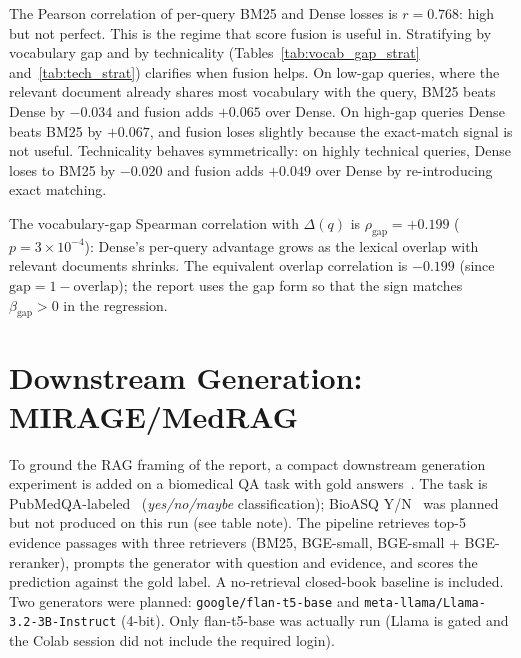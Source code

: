 \documentclass[11pt,a4paper]{article}
\begin{document}
The Pearson correlation of per-query BM25 and Dense losses is
$r = 0.768$: high but not perfect. This is the regime that score
fusion is useful in. Stratifying by vocabulary gap and by technicality
(Tables~\ref{tab:vocab_gap_strat} and~\ref{tab:tech_strat}) clarifies
when fusion helps. On low-gap queries, where the relevant document
already shares most vocabulary with the query, BM25 beats Dense by
$-0.034$ and fusion adds $+0.065$ over Dense. On high-gap queries
Dense beats BM25 by $+0.067$, and fusion loses slightly because the
exact-match signal is not useful. Technicality behaves symmetrically:
on highly technical queries, Dense loses to BM25 by $-0.020$ and
fusion adds $+0.049$ over Dense by re-introducing exact matching.

\begin{table}[ht]
\centering
\caption{Vocabulary-gap stratification of NFCorpus test (tertile split).
The vocabulary gap is $1 - \max_{d \in \text{qrel}(q)}
\text{overlap}(q, d)$.}
\label{tab:vocab_gap_strat}
\small

\end{table}

\begin{table}[ht]
\centering
\caption{Technicality (mean IDF) stratification of NFCorpus test
(tertile split).}
\label{tab:tech_strat}
\small

\end{table}

The vocabulary-gap Spearman correlation with $\Delta(q)$ is
$\rho_{\text{gap}} = +0.199$ ($p = 3\!\times\!10^{-4}$): Dense's
per-query advantage grows as the lexical overlap with relevant
documents shrinks. The equivalent overlap correlation is $-0.199$
(since $\text{gap} = 1 - \text{overlap}$); the report uses the gap
form so that the sign matches $\beta_{\text{gap}} > 0$ in the
regression.

\section{Downstream Generation: MIRAGE/MedRAG}
\label{sec:downstream}

To ground the RAG framing of the report, a compact downstream
generation experiment is added on a biomedical QA task with gold
answers~\cite{Xiong2024MIRAGE}. The task is
PubMedQA-labeled~\cite{Jin2019PubMedQA} (\textit{yes/no/maybe}
classification); BioASQ Y/N~\cite{Tsatsaronis2015BioASQ} was planned but
not produced on this run (see table note). The pipeline retrieves
top-5 evidence passages with three retrievers (BM25, BGE-small,
BGE-small + BGE-reranker), prompts the generator with question and
evidence, and scores the prediction against the gold label. A
no-retrieval closed-book baseline is included. Two generators were
planned: \texttt{google/flan-t5-base} and
\texttt{meta-llama/Llama-3.2-3B-Instruct} (4-bit). Only flan-t5-base
was actually run (Llama is gated and the Colab session did not
include the required login).
\end{document}
